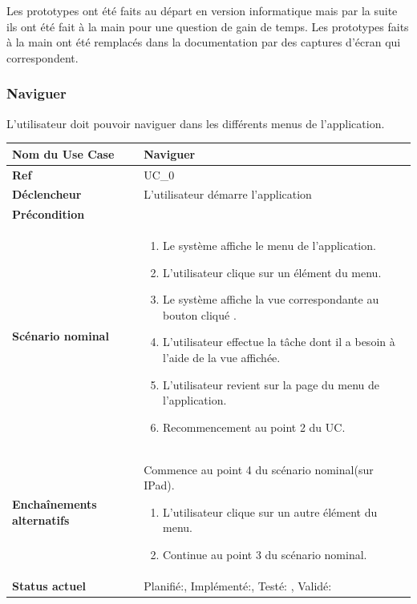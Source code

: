 		Les prototypes ont été faits au départ en version informatique mais par la suite ils ont été fait à la main pour une question de gain de temps. Les prototypes faits à la main ont été remplacés dans la documentation par des captures d'écran qui correspondent.
		 
		\subsubsection{Naviguer}
				L'utilisateur doit pouvoir naviguer dans les différents menus de l'application.\\[0.2cm]
				\begin{longtable}{|l|p{10cm}|}
					\hline \textbf{Nom du Use Case} & Naviguer \\ 
					\hline \textbf{Ref} & UC\_0  \\ 
					\hline \textbf{Déclencheur} & L'utilisateur démarre l'application \\
					\hline \textbf{Précondition} &  \\
					\hline \textbf{Scénario nominal} & 
					\begin{enumerate}
						\item Le système affiche le menu de l'application.
						\item L'utilisateur clique sur  un élément du menu.
						\item Le système affiche la vue correspondante au bouton cliqué .
						\item L'utilisateur effectue la tâche dont il a besoin à l'aide de la vue affichée.
						\item L'utilisateur revient sur la page du menu de l'application.
						\item Recommencement au point 2 du UC.
					\end{enumerate}
					\\ 
					\hline \textbf{Enchaînements alternatifs} &  
						Commence au point 4 du scénario nominal(sur IPad).
						\begin{enumerate}
							\item L'utilisateur clique sur un autre élément du menu.
							\item Continue au point 3 du scénario nominal.
						\end{enumerate}
						
					\\
					\hline \textbf{Status actuel} & Planifié:\CheckedBox , Implémenté:\CheckedBox , Testé: \CheckedBox , Validé: \CheckedBox \\
					\hline 
				\end{longtable} 
